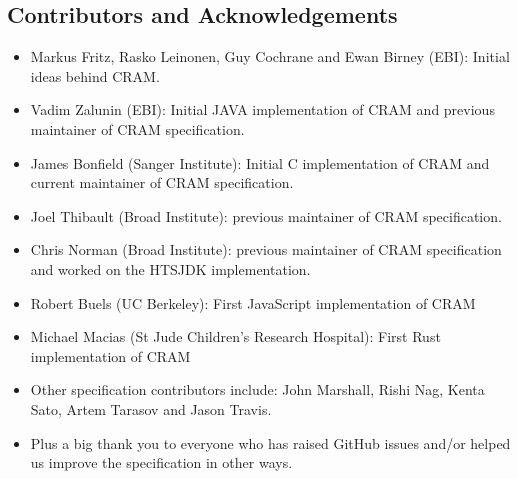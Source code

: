 \documentclass[a4paper]{article}
\begin{document}
\newpage

\subsection{\textbf{Contributors and Acknowledgements}}

\begin{itemize}
\item
Markus Fritz, Rasko Leinonen, Guy Cochrane and Ewan Birney (EBI):
Initial ideas behind CRAM.

\item Vadim Zalunin (EBI):
Initial JAVA implementation of CRAM and previous maintainer of CRAM specification.

\item James Bonfield (Sanger Institute):
Initial C implementation of CRAM and current maintainer of CRAM
specification.

\item Joel Thibault (Broad Institute):
previous maintainer of CRAM specification.

\item Chris Norman (Broad Institute):
previous maintainer of CRAM specification and worked on
the HTSJDK implementation.

\item Robert Buels (UC Berkeley): First JavaScript implementation of CRAM

\item Michael Macias (St Jude Children's Research Hospital): First Rust implementation of CRAM

\item Other specification contributors include: John Marshall, Rishi Nag,
Kenta Sato, Artem Tarasov and Jason Travis.

\item Plus a big thank you to everyone who has raised GitHub issues
and/or helped us improve the specification in other ways.
\end{itemize}
\end{document}
